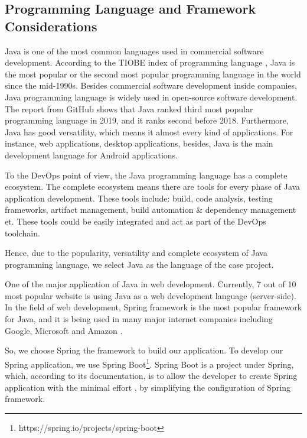 \subsection{Programming Language and Framework Considerations}
Java is one of the most common languages used in commercial software development. According to the TIOBE index of programming language \cite{indexTIO42:online}, Java is the most popular or the second most popular programming language in the world since the mid-1990s. Besides commercial software development inside companies, Java programming language is widely used in open-source software development. The report \cite{TheState3:online} from GitHub shows that Java ranked third most popular programming language in 2019, and it ranks second before 2018. Furthermore, Java has good versatility, which means it almost every kind of applications. For instance, web applications, desktop applications, besides, Java is the main development language for Android applications.
\par
To the DevOps point of view, the Java programming language has a complete ecosystem. The complete ecosystem means there are tools for every phase of Java application development. These tools include: build, code analysis, testing frameworks, artifact management, build automation \& dependency management et. These tools could be easily integrated and act as part of the DevOps toolchain.
\par
Hence, due to the popularity, versatility and complete ecosystem of Java programming language, we select Java as the language of the case project.
\par
One of the major application of Java in web development. Currently, 7 out of 10 \cite{Programm17:online} most popular website is using Java as a web development language (server-side). In the field of web development, Spring framework is the most popular framework for Java, and it is being used in many major internet companies including Google, Microsoft and Amazon \cite{SpringWh14:online}.
\par
So, we choose Spring the framework to build our application. To develop our Spring application, we use Spring Boot\footnote{https://spring.io/projects/spring-boot}. Spring Boot is a project under Spring, which, according to its documentation, is to allow the developer to create Spring application with the minimal effort \cite{SpringBo84:online}, by simplifying the configuration of Spring framework.
